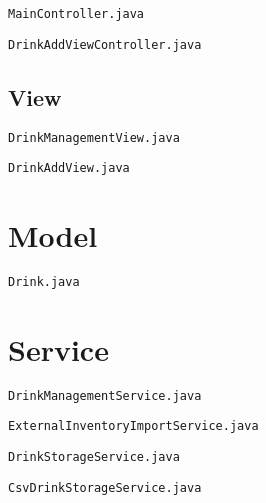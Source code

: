 \verb|MainController.java|



\verb|DrinkAddViewController.java|



\subsection{View}

\verb|DrinkManagementView.java|



\verb|DrinkAddView.java|



\section{Model}

\verb|Drink.java|



\section{Service}

\verb|DrinkManagementService.java|



\verb|ExternalInventoryImportService.java|



\verb|DrinkStorageService.java|



\verb|CsvDrinkStorageService.java|

